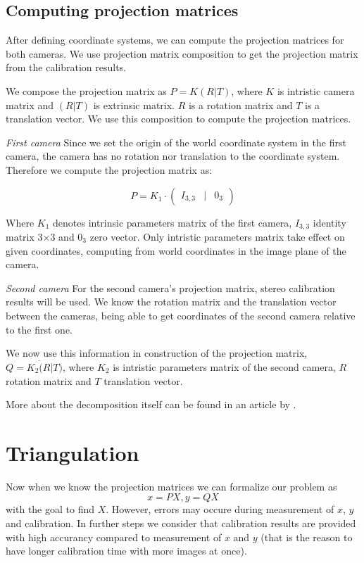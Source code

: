 \subsection{Computing projection matrices}
After defining coordinate systems, we can compute the projection matrices for
both cameras. We use projection matrix composition to get the projection matrix
from the calibration results.

We compose the projection matrix as $P = K(R|T)$, where $K$ is intristic
camera matrix and $(R|T)$ is extrinsic matrix. $R$ is a rotation matrix and
$T$ is a translation vector. We use this composition to compute the projection
matrices.

\emph{First camera}
Since we set the origin of the world coordinate system in the first camera,
the camera has no rotation nor translation to the coordinate system. Therefore
we compute the projection matrix as:

\[
 P = K_1 \cdot \begin{pmatrix}
	I_{3, 3} & | & 0_3  
\end{pmatrix}
\]

Where $K_1$ denotes intrinsic parameters matrix of the first camera, $I_{3,3}$ identity
matrix 3$\times$3 and $0_3$ zero vector. Only intristic parameters matrix take
effect on given coordinates, computing from world coordinates in the image plane of the camera.

\emph{Second camera}
For the second camera's projection matrix, stereo calibration results will be
used. We know the rotation matrix and the translation vector between the cameras,
being able to get coordinates of the second camera relative to the first one.

We now use this information in construction of the projection matrix, $Q = K_2
\dot (R | T)$, where $K_2$ is intristic parameters matrix of the second camera, $R$
rotation matrix and $T$ translation vector.

More about the decomposition itself can be found in an article by
\citet{computervisionblog}.


\section{Triangulation}

Now when we know the projection matrices we can formalize our problem as
\begin{equation}
x = PX, y = QX \label{projection-statements}
\end{equation}
with the goal to find $X$. However, errors may occure during
measurement of $x$, $y$ and calibration. In further steps we consider that
calibration results are provided with high accurancy compared to measurement of
$x$ and $y$ (that is the reason to have longer calibration time with more images
at once).

